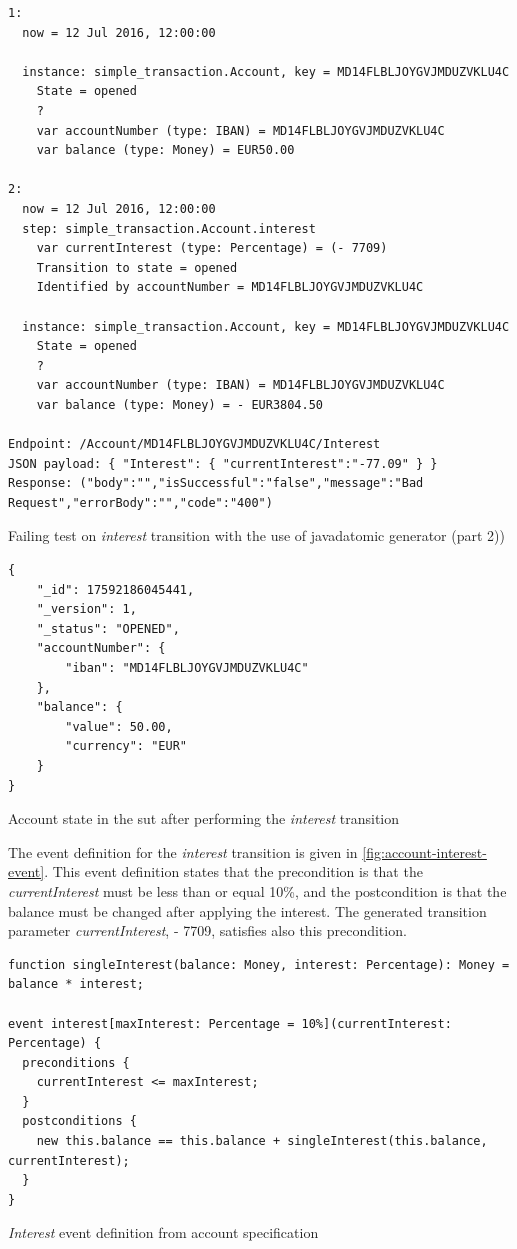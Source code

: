 \begin{sourcecode}[h!]
\begin{lstlisting}[]
1:
  now = 12 Jul 2016, 12:00:00

  instance: simple_transaction.Account, key = MD14FLBLJOYGVJMDUZVKLU4C
    State = opened
    ?
    var accountNumber (type: IBAN) = MD14FLBLJOYGVJMDUZVKLU4C
    var balance (type: Money) = EUR50.00

2:
  now = 12 Jul 2016, 12:00:00
  step: simple_transaction.Account.interest
    var currentInterest (type: Percentage) = (- 7709)
    Transition to state = opened
    Identified by accountNumber = MD14FLBLJOYGVJMDUZVKLU4C

  instance: simple_transaction.Account, key = MD14FLBLJOYGVJMDUZVKLU4C
    State = opened
    ?
    var accountNumber (type: IBAN) = MD14FLBLJOYGVJMDUZVKLU4C
    var balance (type: Money) = - EUR3804.50

Endpoint: /Account/MD14FLBLJOYGVJMDUZVKLU4C/Interest
JSON payload: { "Interest": { "currentInterest":"-77.09" } }
Response: ("body":"","isSuccessful":"false","message":"Bad Request","errorBody":"","code":"400")
\end{lstlisting}
\caption{Failing test on \textit{interest} transition with the use of javadatomic generator (part 2))}\label{fig:result-javadatomic-interest-p2}
\end{sourcecode}
\FloatBarrier

\begin{sourcecode}[h!]
\begin{lstlisting}[]
{
	"_id": 17592186045441,
	"_version": 1,
	"_status": "OPENED",
	"accountNumber": {
		"iban": "MD14FLBLJOYGVJMDUZVKLU4C"
	},
	"balance": {
		"value": 50.00,
		"currency": "EUR"
	}
}
\end{lstlisting}
\caption{Account state in the \gls{sut} after performing the \textit{interest} transition}\label{fig:interest-opened-account-json}\end{sourcecode}
\FloatBarrier

The event definition for the \textit{interest} transition is given in
\autoref{fig:account-interest-event}. This event definition states that the
precondition is that the \textit{currentInterest} must be less than or equal
10\%, and the postcondition is that the balance must be changed after applying
the interest. The generated transition parameter \textit{currentInterest},
- 7709, satisfies also this precondition.

\begin{sourcecode}[h!]
\begin{lstlisting}[]
function singleInterest(balance: Money, interest: Percentage): Money =  balance * interest;

event interest[maxInterest: Percentage = 10%](currentInterest: Percentage) {
  preconditions {
    currentInterest <= maxInterest;
  }
  postconditions {
    new this.balance == this.balance + singleInterest(this.balance, currentInterest);
  }
}
\end{lstlisting}
\caption{\textit{Interest} event definition from account specification}\label{fig:account-interest-event}
\end{sourcecode}
\FloatBarrier

